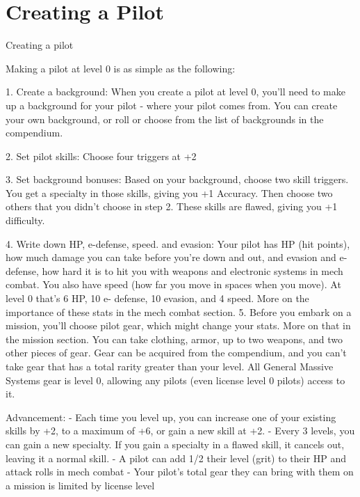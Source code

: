 \chapter{Creating a Pilot}
                                              Creating a pilot

Making a pilot at level 0 is as simple as the following:


     1.  Create a background: When you create a pilot at level 0, you’ll need to make up a
         background for your pilot - where your pilot comes from. You can create your own
         background, or roll or choose from the list of backgrounds in the compendium.

    2.   Set pilot skills: Choose four triggers at +2

    3.   Set background bonuses: Based on your background, choose two skill triggers. You get
         a specialty in those skills, giving you +1 Accuracy. Then choose two others that you didn’t
         choose in step 2. These skills are flawed, giving you +1 difficulty.

    4.   Write down HP, e-defense, speed. and evasion: Your pilot has HP (hit points), how much
         damage you can take before you’re down and out, and evasion and e-defense, how
         hard it is to hit you with weapons and electronic systems in mech combat. You also have
         speed (how far you move in spaces when you move). At level 0 that’s 6 HP, 10 e-
         defense, 10 evasion, and 4 speed. More on the importance of these stats in the mech
         combat section.
    5.   Before you embark on a mission, you’ll choose pilot gear, which might change your
         stats. More on that in the mission section. You can take clothing, armor, up to two
         weapons, and two other pieces of gear. Gear can be acquired from the compendium, and
         you can’t take gear that has a total rarity greater than your level. All General Massive
         Systems gear is level 0, allowing any pilots (even license level 0 pilots) access to it.


Advancement:
          - Each time you level up, you can increase one of your existing skills by +2, to a maximum
         of +6, or gain a new skill at +2.
          - Every 3 levels, you can gain a new specialty. If you gain a specialty in a flawed skill, it
         cancels out, leaving it a normal skill.
         - A pilot can add 1/2 their level (grit) to their HP and attack rolls in mech combat
         - Your pilot’s total gear they can bring with them on a mission is limited by license level



